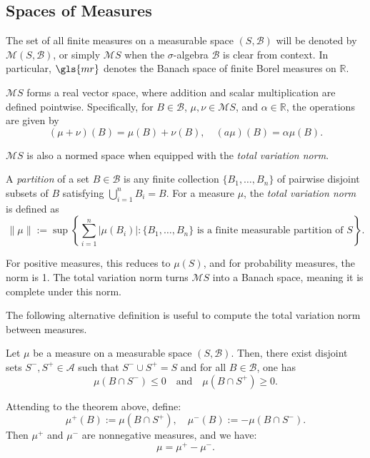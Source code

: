 \subsection{Spaces of Measures}

The set of all finite measures on a measurable space $(S, \mathcal{B})$ will be denoted by $\mathcal{M}(S, \mathcal{B})$, 
or simply $\mathcal{M}S$ when the $\sigma$-algebra $\mathcal{B}$ is clear from context. In particular, $\gls{mr}$ denotes  the Banach space of finite Borel measures on $\mathbb{R}$.

 $\mathcal{M}S $ forms a real vector space, where addition and scalar multiplication are defined pointwise. Specifically, for  $ B \in \mathcal{B} $, $ \mu, \nu \in \mathcal{M}S $, and $ \alpha \in \mathbb{R} $, the operations are given by
$$
(\mu + \nu)(B) = \mu(B) + \nu(B), \quad (a\mu)(B) = \alpha \mu(B).
$$


\( \mathcal{M}S \) is also a normed space when equipped with the \emph{total variation norm}. 

\begin{definition} \label{def:tvnorm}
  A \emph{partition} of a set \( B \in \mathcal{B} \) is any finite collection \( \{B_1, \dots, B_n\} \) of pairwise disjoint subsets of \( B \) satisfying \( \bigcup_{i=1}^{n} B_i = B \). For a measure \( \mu \), the \emph{total variation norm} is defined as
$$
\|\mu\| := \sup \left\{ \sum_{i=1}^n |\mu(B_i)| : \{B_1, \dots, B_n\} \text{ is a finite measurable partition of } S \right\}.
$$
\end{definition}

For positive measures, this reduces to \( \mu(S) \), and for probability measures, the norm is 1. The total variation norm turns \( \mathcal{M}S \) into a Banach space, meaning it is complete under this norm. 

The following alternative definition is useful to compute the total variation norm between measures.

\begin{theorem} \cite[Theorem 3.1.1]{bogachevMeasureTheory2007}
  Let \( \mu \) be a measure on a measurable space \( (S, \mathcal{B}) \). Then, there exist disjoint sets \( S^-, S^+ \in \mathcal{A} \) such that $S^- \cup S^+ = S$
and for all \( B \in \mathcal{B} \), one has
\[
\mu(B \cap S^-) \leq 0 \quad \text{and} \quad \mu(B \cap S^+) \geq 0.
\]
\end{theorem}

\begin{corollary} \cite[Corollary 3.1.2]{bogachevMeasureTheory2007}
  Attending to the theorem above, define:
\[
\mu^+(B) := \mu(B \cap S^+), \quad \mu^-(B) := -\mu(B \cap S^-). 
\]
Then \( \mu^+ \) and \( \mu^- \) are nonnegative measures, and we have:
\[
\mu = \mu^+ - \mu^-.
\]
\end{corollary}

